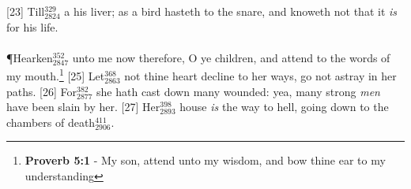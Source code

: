 [23] \textcolor[cmyk]{0.99998,1,0,0}{Till\textcolor{jungle}{$_{2824}^{329}$} a  his liver; as a bird hasteth to the snare, and knoweth not that it \emph{is} for his life.}\\
\\
\P \textcolor[cmyk]{0.99998,1,0,0}{Hearken\textcolor{jungle}{$_{2847}^{352}$} unto me now therefore, O ye children, and attend to the words of my mouth.}\footnote{\textbf{Proverb 5:1} - My son, attend unto my wisdom, and bow thine ear to my understanding}
[25] \textcolor[cmyk]{0.99998,1,0,0}{Let\textcolor{jungle}{$_{2863}^{368}$} not thine heart decline to her ways, go not astray in her paths.}
[26] \textcolor[cmyk]{0.99998,1,0,0}{For\textcolor{jungle}{$_{2877}^{382}$} she hath cast down many wounded: yea, many strong \emph{men} have been slain by her.}
[27] \textcolor[cmyk]{0.99998,1,0,0}{Her\textcolor{jungle}{$_{2893}^{398}$} house \emph{is} the way to hell, going down to the chambers of death\textcolor{jungle}{$_{2906}^{411}$}.}





